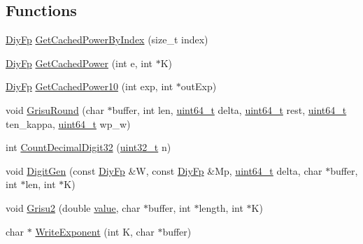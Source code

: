 \subsection*{Functions}
\begin{DoxyCompactItemize}
\item 
\mbox{\hyperlink{structrapidjson_1_1internal_1_1_diy_fp}{Diy\+Fp}} \mbox{\hyperlink{namespacerapidjson_1_1internal_a25a77e349cce869daae13c1bdd058d4a}{Get\+Cached\+Power\+By\+Index}} (size\+\_\+t index)
\item 
\mbox{\hyperlink{structrapidjson_1_1internal_1_1_diy_fp}{Diy\+Fp}} \mbox{\hyperlink{namespacerapidjson_1_1internal_a7c58ee2ca622624367808fa3a40dc9e3}{Get\+Cached\+Power}} (int e, int $\ast$K)
\item 
\mbox{\hyperlink{structrapidjson_1_1internal_1_1_diy_fp}{Diy\+Fp}} \mbox{\hyperlink{namespacerapidjson_1_1internal_a21de5a1527938da9b57c84699ce519e7}{Get\+Cached\+Power10}} (int exp, int $\ast$out\+Exp)
\item 
void \mbox{\hyperlink{namespacerapidjson_1_1internal_a7d7397686d2c8c57cf11d9afae17bb4d}{Grisu\+Round}} (char $\ast$buffer, int len, \mbox{\hyperlink{stdint_8h_aec6fcb673ff035718c238c8c9d544c47}{uint64\+\_\+t}} delta, \mbox{\hyperlink{stdint_8h_aec6fcb673ff035718c238c8c9d544c47}{uint64\+\_\+t}} rest, \mbox{\hyperlink{stdint_8h_aec6fcb673ff035718c238c8c9d544c47}{uint64\+\_\+t}} ten\+\_\+kappa, \mbox{\hyperlink{stdint_8h_aec6fcb673ff035718c238c8c9d544c47}{uint64\+\_\+t}} wp\+\_\+w)
\item 
int \mbox{\hyperlink{namespacerapidjson_1_1internal_ace8d1c16dab8600e0641c4fb6c81aff7}{Count\+Decimal\+Digit32}} (\mbox{\hyperlink{stdint_8h_a435d1572bf3f880d55459d9805097f62}{uint32\+\_\+t}} n)
\item 
void \mbox{\hyperlink{namespacerapidjson_1_1internal_a6ba68d7defea7ccc4f8aa2feeafeccde}{Digit\+Gen}} (const \mbox{\hyperlink{structrapidjson_1_1internal_1_1_diy_fp}{Diy\+Fp}} \&W, const \mbox{\hyperlink{structrapidjson_1_1internal_1_1_diy_fp}{Diy\+Fp}} \&Mp, \mbox{\hyperlink{stdint_8h_aec6fcb673ff035718c238c8c9d544c47}{uint64\+\_\+t}} delta, char $\ast$buffer, int $\ast$len, int $\ast$K)
\item 
void \mbox{\hyperlink{namespacerapidjson_1_1internal_a74828fd6e9a874421231ef346b1126f3}{Grisu2}} (double \mbox{\hyperlink{namespacerapidjson_a1a75d60792094d496b500c40776030dd}{value}}, char $\ast$buffer, int $\ast$length, int $\ast$K)
\item 
char $\ast$ \mbox{\hyperlink{namespacerapidjson_1_1internal_adacfea46aca31aae732f952a9872b6e6}{Write\+Exponent}} (int K, char $\ast$buffer)

\end{DoxyCompactItemize}
